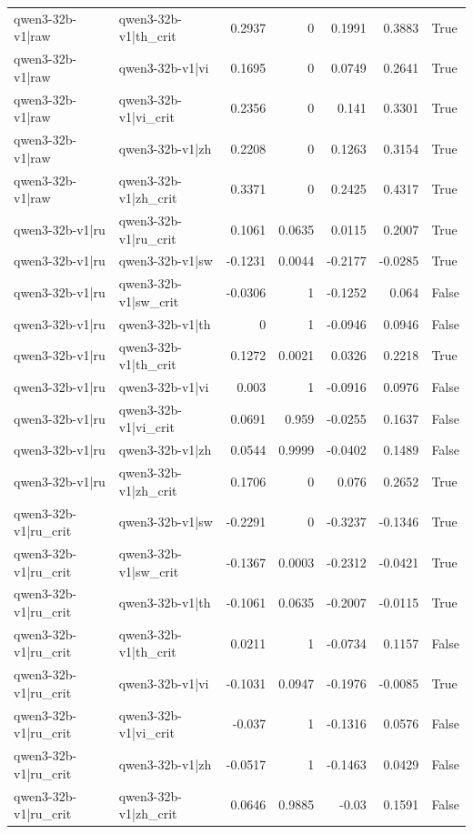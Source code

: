 \begin{table}
\begin{tabular}{l l r r r r l}
qwen3-32b-v1|raw & qwen3-32b-v1|th_crit & 0.2937 & 0 & 0.1991 & 0.3883 & True \\
qwen3-32b-v1|raw & qwen3-32b-v1|vi & 0.1695 & 0 & 0.0749 & 0.2641 & True \\
qwen3-32b-v1|raw & qwen3-32b-v1|vi_crit & 0.2356 & 0 & 0.141 & 0.3301 & True \\
qwen3-32b-v1|raw & qwen3-32b-v1|zh & 0.2208 & 0 & 0.1263 & 0.3154 & True \\
qwen3-32b-v1|raw & qwen3-32b-v1|zh_crit & 0.3371 & 0 & 0.2425 & 0.4317 & True \\
qwen3-32b-v1|ru & qwen3-32b-v1|ru_crit & 0.1061 & 0.0635 & 0.0115 & 0.2007 & True \\
qwen3-32b-v1|ru & qwen3-32b-v1|sw & -0.1231 & 0.0044 & -0.2177 & -0.0285 & True \\
qwen3-32b-v1|ru & qwen3-32b-v1|sw_crit & -0.0306 & 1 & -0.1252 & 0.064 & False \\
qwen3-32b-v1|ru & qwen3-32b-v1|th & 0 & 1 & -0.0946 & 0.0946 & False \\
qwen3-32b-v1|ru & qwen3-32b-v1|th_crit & 0.1272 & 0.0021 & 0.0326 & 0.2218 & True \\
qwen3-32b-v1|ru & qwen3-32b-v1|vi & 0.003 & 1 & -0.0916 & 0.0976 & False \\
qwen3-32b-v1|ru & qwen3-32b-v1|vi_crit & 0.0691 & 0.959 & -0.0255 & 0.1637 & False \\
qwen3-32b-v1|ru & qwen3-32b-v1|zh & 0.0544 & 0.9999 & -0.0402 & 0.1489 & False \\
qwen3-32b-v1|ru & qwen3-32b-v1|zh_crit & 0.1706 & 0 & 0.076 & 0.2652 & True \\
qwen3-32b-v1|ru_crit & qwen3-32b-v1|sw & -0.2291 & 0 & -0.3237 & -0.1346 & True \\
qwen3-32b-v1|ru_crit & qwen3-32b-v1|sw_crit & -0.1367 & 0.0003 & -0.2312 & -0.0421 & True \\
qwen3-32b-v1|ru_crit & qwen3-32b-v1|th & -0.1061 & 0.0635 & -0.2007 & -0.0115 & True \\
qwen3-32b-v1|ru_crit & qwen3-32b-v1|th_crit & 0.0211 & 1 & -0.0734 & 0.1157 & False \\
qwen3-32b-v1|ru_crit & qwen3-32b-v1|vi & -0.1031 & 0.0947 & -0.1976 & -0.0085 & True \\
qwen3-32b-v1|ru_crit & qwen3-32b-v1|vi_crit & -0.037 & 1 & -0.1316 & 0.0576 & False \\
qwen3-32b-v1|ru_crit & qwen3-32b-v1|zh & -0.0517 & 1 & -0.1463 & 0.0429 & False \\
qwen3-32b-v1|ru_crit & qwen3-32b-v1|zh_crit & 0.0646 & 0.9885 & -0.03 & 0.1591 & False \\

\end{tabular}
\end{table}
